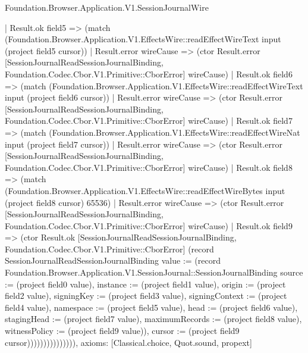 \begin{lexlean}{Foundation.Browser.Application.V1.SessionJournalWire}
\begin{semanticmodule}
{                  | Result.ok field5 => (match (Foundation.Browser.Application.V1.EffectsWire::readEffectWireText input (project field5 cursor))
                    | Result.error wireCause => (ctor Result.error [SessionJournalReadSessionJournalBinding, Foundation.Codec.Cbor.V1.Primitive::CborError] wireCause)
                    | Result.ok field6 => (match (Foundation.Browser.Application.V1.EffectsWire::readEffectWireText input (project field6 cursor))
                      | Result.error wireCause => (ctor Result.error [SessionJournalReadSessionJournalBinding, Foundation.Codec.Cbor.V1.Primitive::CborError] wireCause)
                      | Result.ok field7 => (match (Foundation.Browser.Application.V1.EffectsWire::readEffectWireNat input (project field7 cursor))
                        | Result.error wireCause => (ctor Result.error [SessionJournalReadSessionJournalBinding, Foundation.Codec.Cbor.V1.Primitive::CborError] wireCause)
                        | Result.ok field8 => (match (Foundation.Browser.Application.V1.EffectsWire::readEffectWireBytes input (project field8 cursor) 65536)
                          | Result.error wireCause => (ctor Result.error [SessionJournalReadSessionJournalBinding, Foundation.Codec.Cbor.V1.Primitive::CborError] wireCause)
                          | Result.ok field9 => (ctor Result.ok [SessionJournalReadSessionJournalBinding, Foundation.Codec.Cbor.V1.Primitive::CborError] (record SessionJournalReadSessionJournalBinding {value := (record Foundation.Browser.Application.V1.SessionJournal::SessionJournalBinding {source := (project field0 value), instance := (project field1 value), origin := (project field2 value), signingKey := (project field3 value), signingContext := (project field4 value), namespace := (project field5 value), head := (project field6 value), stagingHead := (project field7 value), maximumRecords := (project field8 value), witnessPolicy := (project field9 value)}), cursor := (project field9 cursor)})))))))))))))),
  axioms: [Classical.choice, Quot.sound, propext]
}


\end{semanticmodule}
\end{lexlean}
